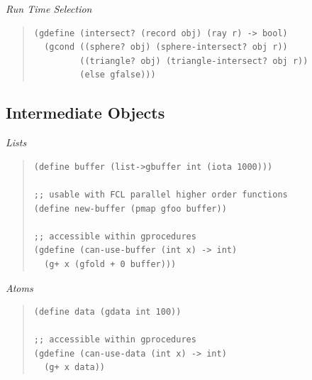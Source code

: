 \documentclass{article}
\begin{document}
{\emph{Run Time Selection}}

\begin{quote}
\begin{verbatim}
(gdefine (intersect? (record obj) (ray r) -> bool)
  (gcond ((sphere? obj) (sphere-intersect? obj r))
         ((triangle? obj) (triangle-intersect? obj r))
         (else gfalse)))
\end{verbatim}
\end{quote}


\subsection{Intermediate Objects}

{\emph{Lists}}

\begin{quote}
\begin{verbatim}
(define buffer (list->gbuffer int (iota 1000)))

;; usable with FCL parallel higher order functions
(define new-buffer (pmap gfoo buffer))

;; accessible within gprocedures
(gdefine (can-use-buffer (int x) -> int)
  (g+ x (gfold + 0 buffer)))

\end{verbatim}
\end{quote}

{\emph{Atoms}}

\begin{quote}
\begin{verbatim}
(define data (gdata int 100))

;; accessible within gprocedures
(gdefine (can-use-data (int x) -> int)
  (g+ x data))

\end{verbatim}
\end{quote}
\end{document}

